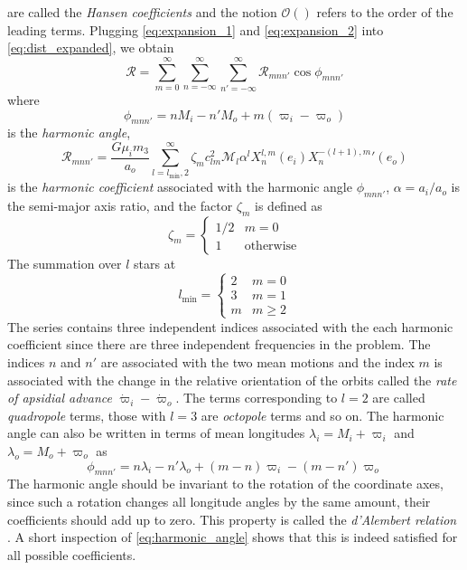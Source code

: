 are called the \emph{Hansen coefficients} and the notion $\mathcal{O}()$
refers to the order of the leading terms. Plugging \cref{eq:expansion_1}
and \cref{eq:expansion_2} into \cref{eq:dist_expanded}, we obtain
\citep{Mardling2013}
\begin{equation}
    \mathcal{R}=\sum^\infty_{m=0}\sum^\infty_{n=-\infty}\sum^\infty_{n'=-\infty}
    \mathcal{R}_{mnn'}\cos\phi_{mnn'}
    \label{eq:disturbing_function}
\end{equation}
where 
\begin{equation}
    \phi_{mnn'}=nM_i-n'M_o+m(\varpi_i-\varpi_o)
\end{equation}
is the \emph{harmonic angle},
\begin{equation}
    \mathcal{R}_{mnn'}= \frac{G\mu_im_3}{a_o} \sum^\infty_{l=l_\text{min},2}
    \zeta_m c_{lm}^2\mathcal{M}_l\alpha^l X^{l,m}_n(e_i)X^{-(l+1),m}_n'(e_o)
    \label{eq:harmonic_coefficient}
\end{equation}
is the \emph{harmonic coefficient} associated with the harmonic angle
$\phi_{mnn'}$, $\alpha=a_i/a_o$ is the semi-major axis ratio, 
and the factor $\zeta_m$ is defined as
\begin{equation}
    \zeta_m=
    \begin{cases}
        1/2 & m=0\\
        1 & \text{otherwise}
    \end{cases}
\end{equation}
The summation over $l$ stars at
\begin{equation}
    l_\text{min}=
    \begin{cases}
        2 & m=0\\
        3 & m=1\\
        m & m\geq 2
    \end{cases}
\end{equation}
The series contains three independent indices associated with the each 
harmonic coefficient since there are three independent frequencies in the 
problem. The indices $n$ and $n'$ are associated with the  two mean 
motions and the index $m$ is associated with the change in the
relative orientation of the orbits called the 
\emph{rate of apsidial advance} $\dot{\varpi}_i-\dot{\varpi}_o$. 
The terms corresponding to $l=2$ are called \emph{quadropole} 
terms, those with $l=3$ are \emph{octopole} terms and so on. The harmonic
angle can also be written in terms of mean longitudes $\lambda_i=M_i+\varpi_i$
and $\lambda_o=M_o+\varpi_o$ as
\begin{equation}
    \phi_{mnn'}=n\lambda_i-n'\lambda_o+(m-n)\varpi_i-(m-n')\varpi_o
    \label{eq:harmonic_angle}
\end{equation}
The harmonic angle should be invariant to the rotation of the coordinate axes, 
since such a rotation changes all longitude angles by the same amount, their 
coefficients should add up to zero. This property is called the 
\emph{d'Alembert relation} \citep{murray}. A short inspection of 
\cref{eq:harmonic_angle} shows that this is indeed satisfied for all possible
coefficients.

